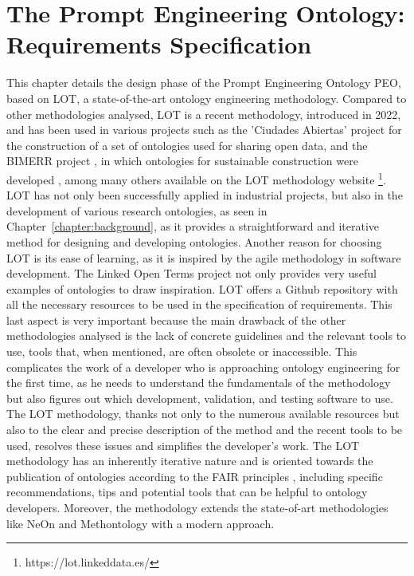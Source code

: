
\chapter{The Prompt Engineering Ontology: Requirements Specification}
\label{chapter:3_design}
This chapter details the design phase of the Prompt Engineering Ontology PEO, based on LOT, a state-of-the-art ontology engineering methodology.
Compared to other methodologies analysed, LOT is a recent methodology, introduced in 2022, and has been used in various projects such as the 'Ciudades Abiertas' project \cite{ciudad} for the construction of a set of ontologies used for sharing open data, and the BIMERR project \cite{bimerr}, in which ontologies for sustainable construction were developed \cite{bountouni2021bimerr}, among many others available on the LOT methodology website \footnote{https://lot.linkeddata.es/}.
LOT has not only been successfully applied in industrial projects, but also in the development of various research ontologies, as seen in Chapter~\ref{chapter:background}, as it provides a straightforward and iterative method for designing and developing ontologies.
Another reason for choosing LOT is its ease of learning, as it is inspired by the agile methodology in software development. The Linked Open Terms project not only provides very useful examples of ontologies to draw inspiration. LOT offers a Github repository \cite{lot_github} with all the necessary resources to be used in the specification of requirements.
This last aspect is very important because the main drawback of the other methodologies analysed is the lack of concrete guidelines and the relevant tools to use, tools that, when mentioned, are often obsolete or inaccessible.
This complicates the work of a developer who is approaching ontology engineering for the first time, as he needs to understand the fundamentals of the methodology but also figures out which development, validation, and testing software to use.
The LOT methodology, thanks not only to the numerous available resources but also to the clear and precise description of the method and the recent tools to be used, resolves these issues and simplifies the developer's work.
The LOT methodology has an inherently iterative nature and is oriented towards the publication of ontologies according to the FAIR principles \cite{fair_eu}, including specific recommendations, tips and potential
tools that can be helpful to ontology developers.
Moreover, the methodology extends the state-of-art methodologies like NeOn and Methontology with a modern approach.

